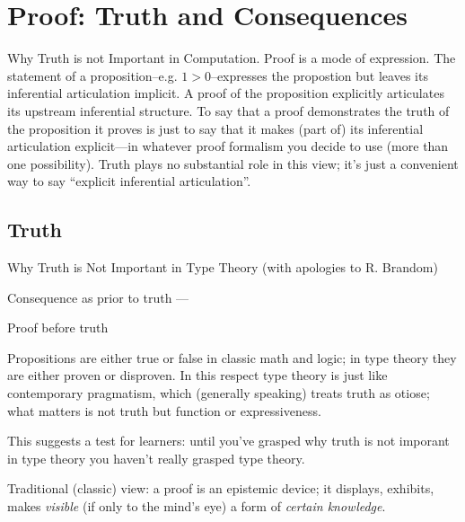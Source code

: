 \chapter{Proof: Truth and Consequences}
\label{sect:prooftruth}

\begin{ednote}
  Why Truth is not Important in Computation.  Proof is a mode of
  expression.  The statement of a proposition--e.g. \(1>0\)--expresses
  the propostion but leaves its inferential articulation implicit.  A
  proof of the proposition explicitly articulates its upstream
  inferential structure.  To say that a proof demonstrates the truth
  of the proposition it proves is just to say that it makes (part of)
  its inferential articulation explicit---in whatever proof formalism
  you decide to use (more than one possibility).  Truth plays no
  substantial role in this view; it's just a convenient way to say
  ``explicit inferential articulation''.
\end{ednote}

\section{Truth}
\label{subs:truth}

Why Truth is Not Important in Type Theory (with apologies to
R. Brandom\cite{brandom_why_2009})

Consequence as prior to truth --- \cite{schroeder-heister_pts}

Proof before truth \cite{schroeder-heister_validity_2006}

\begin{ednote}
  Propositions are either true or false in classic math and logic; in
  type theory they are either proven or disproven.  In this respect
  type theory is just like contemporary pragmatism, which (generally
  speaking) treats truth as otiose; what matters is not truth but
  function or expressiveness.

  This suggests a test for learners: until you've grasped why truth is
  not imporant in type theory you haven't really grasped type theory.
\end{ednote}

Traditional (classic) view: a proof is an epistemic device; it
displays, exhibits, makes \textit{visible} (if only to the mind's eye)
a form of \textit{certain knowledge}.

